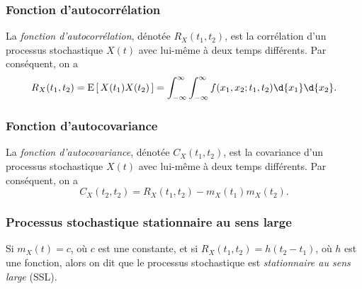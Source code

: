 \documentclass[11pt]{article}
\newcommand\Esp[1]{%
	\ensuremath{%
		\mathrm{E}\left[\,#1\,\right]%
	}%
}%
\begin{document}
\subsubsection{Fonction d'autocorrélation}
\begin{definition}
	La \textit{fonction d'autocorrélation}, dénotée $R_X(t_1,t_2)$, est la
	corrélation d'un processus stochastique $X(t)$ avec lui-même à deux temps
	différents. Par conséquent, on a
	\begin{equation*}
		R_X(t_1,t_2)
		=\Esp{X(t_1)X(t_2)}
		=\int_{-\infty}^\infty\int_{-\infty}^\infty
			f(x_1,x_2;t_1,t_2)\d{x_1}\d{x_2}.
	\end{equation*}
\end{definition}

\subsubsection{Fonction d'autocovariance}
\begin{definition}
	La \textit{fonction d'autocovariance}, dénotée $C_X(t_1,t_2)$, est la
	covariance d'un processus stochastique $X(t)$ avec lui-même à deux temps
	différents. Par conséquent, on a
	\begin{equation*}
		C_X(t_2,t_2)
		=R_X(t_1,t_2)-m_X(t_1)m_X(t_2).
	\end{equation*}
\end{definition}

\subsubsection{Processus stochastique stationnaire au sens large}
\begin{definition}
	Si $m_X(t)=c$, où $c$ est une constante, et si $R_X(t_1,t_2)=h(t_2-t_1)$, où
	$h$ est une fonction, alors on dit que le processus stochastique est
	\textit{stationnaire au sens large} (SSL).
\end{definition}
\end{document}
